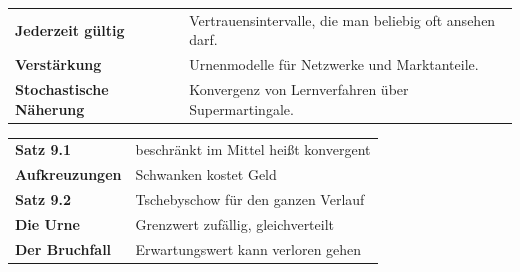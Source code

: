 \begin{forschung}
\begin{center}
{\small
\renewcommand{\arraystretch}{1.45}
\begin{tabular}{@{}P{3.0cm}P{5.2cm}@{}}
\toprule
\textbf{Jederzeit gültig} & Vertrauensintervalle, die man beliebig oft ansehen darf.\\
\textbf{Verstärkung} & Urnenmodelle für Netzwerke und Marktanteile.\\
\textbf{Stochastische Näherung} & Konvergenz von Lernverfahren über Supermartingale.\\
\bottomrule
\end{tabular}}
\end{center}

\begin{center}
\begin{minipage}{0.88\textwidth}
\end{minipage}
\end{center}
\end{forschung}

\begin{merksatz}
\begin{center}
\renewcommand{\arraystretch}{1.5}
\begin{tabular}{@{}P{3.0cm}P{5.6cm}@{}}
\toprule
\textbf{Satz 9.1} & beschränkt im Mittel heißt konvergent\\
\textbf{Aufkreuzungen} & Schwanken kostet Geld\\
\textbf{Satz 9.2} & Tschebyschow für den ganzen Verlauf\\
\textbf{Die Urne} & Grenzwert zufällig, gleichverteilt\\
\textbf{Der Bruchfall} & Erwartungswert kann verloren gehen\\
\bottomrule
\end{tabular}
\end{center}

\begin{center}
\begin{minipage}{0.88\textwidth}
\end{minipage}
\end{center}
\end{merksatz}
